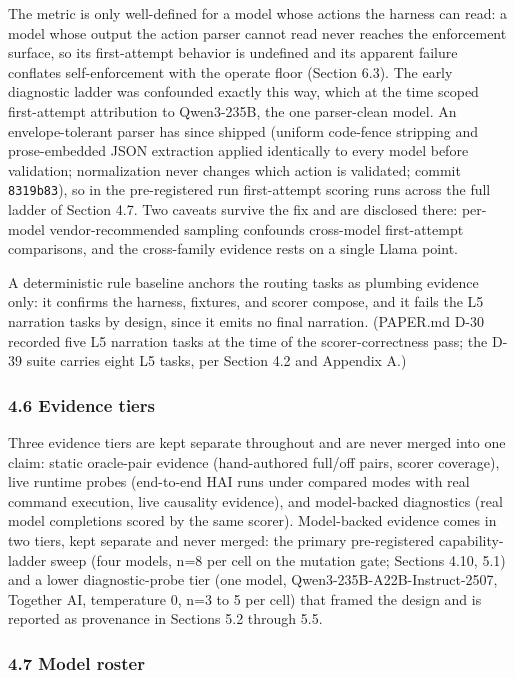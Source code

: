 \documentclass[
]{article}
\begin{document}
The metric is only well-defined for a model whose actions the harness
can read: a model whose output the action parser cannot read never
reaches the enforcement surface, so its first-attempt behavior is
undefined and its apparent failure conflates self-enforcement with the
operate floor (Section 6.3). The early diagnostic ladder was confounded
exactly this way, which at the time scoped first-attempt attribution to
Qwen3-235B, the one parser-clean model. An envelope-tolerant parser has
since shipped (uniform code-fence stripping and prose-embedded JSON
extraction applied identically to every model before validation;
normalization never changes which action is validated; commit
\texttt{8319b83}), so in the pre-registered run first-attempt scoring
runs across the full ladder of Section 4.7. Two caveats survive the fix
and are disclosed there: per-model vendor-recommended sampling confounds
cross-model first-attempt comparisons, and the cross-family evidence
rests on a single Llama point.

A deterministic rule baseline anchors the routing tasks as plumbing
evidence only: it confirms the harness, fixtures, and scorer compose,
and it fails the L5 narration tasks by design, since it emits no final
narration. (PAPER.md D-30 recorded five L5 narration tasks at the time
of the scorer-correctness pass; the D-39 suite carries eight L5 tasks,
per Section 4.2 and Appendix A.)

\subsubsection{4.6 Evidence tiers}\label{evidence-tiers}

Three evidence tiers are kept separate throughout and are never merged
into one claim: static oracle-pair evidence (hand-authored full/off
pairs, scorer coverage), live runtime probes (end-to-end HAI runs under
compared modes with real command execution, live causality evidence),
and model-backed diagnostics (real model completions scored by the same
scorer). Model-backed evidence comes in two tiers, kept separate and
never merged: the primary pre-registered capability-ladder sweep (four
models, n=8 per cell on the mutation gate; Sections 4.10, 5.1) and a
lower diagnostic-probe tier (one model, Qwen3-235B-A22B-Instruct-2507,
Together AI, temperature 0, n=3 to 5 per cell) that framed the design
and is reported as provenance in Sections 5.2 through 5.5.

\subsubsection{4.7 Model roster}\label{model-roster}
\end{document}
